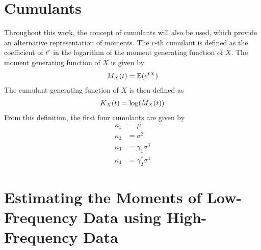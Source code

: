 \section{Cumulants}

Throughout this work, the concept of cumulants will also be used, which provide an alternative representation of moments. The $r$-th cumulant is defined as the coefficient of $t^r$ in the logarithm of the moment generating function of $X$. The moment generating function of $X$ is given by
\begin{align}
    M_X(t) = \mathbb{E}(e^{tX})\notag
\end{align}
The cumulant generating function of $X$ is then defined as
\begin{align}
    K_X(t) = \log(M_X(t))\notag
\end{align} 
From this definition, the first four cumulants are given by
\begin{align}
    \label{eq:cumulants_1}
    \kappa_1 &= \mu\\
    \label{eq:cumulants_2}
    \kappa_2 &= \sigma^2\\
    \label{eq:cumulants_3}
    \kappa_3 &= \gamma_1\sigma^3\\
    \label{eq:cumulants_4}
    \kappa_4 &= \gamma_2^*\sigma^4
\end{align}

\section{Estimating the Moments of Low-Frequency Data using High-Frequency Data}


